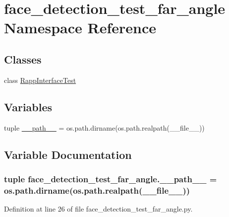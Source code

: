\hypertarget{namespaceface__detection__test__far__angle}{\section{face\-\_\-detection\-\_\-test\-\_\-far\-\_\-angle Namespace Reference}
\label{namespaceface__detection__test__far__angle}
}
\subsection*{Classes}
\begin{DoxyCompactItemize}
\item 
class \hyperlink{classface__detection__test__far__angle_1_1RappInterfaceTest}{Rapp\-Interface\-Test}
\end{DoxyCompactItemize}
\subsection*{Variables}
\begin{DoxyCompactItemize}
\item 
tuple \hyperlink{namespaceface__detection__test__far__angle_adbc7e4d09199bdba4ca4c8aa21482ba1}{\-\_\-\-\_\-path\-\_\-\-\_\-} = os.\-path.\-dirname(os.\-path.\-realpath(\-\_\-\-\_\-file\-\_\-\-\_\-))
\end{DoxyCompactItemize}


\subsection{Variable Documentation}
\hypertarget{namespaceface__detection__test__far__angle_adbc7e4d09199bdba4ca4c8aa21482ba1}{
\subsubsection[{\-\_\-\-\_\-path\-\_\-\-\_\-}]{\setlength{\rightskip}{0pt plus 5cm}tuple face\-\_\-detection\-\_\-test\-\_\-far\-\_\-angle.\-\_\-\-\_\-path\-\_\-\-\_\- = os.\-path.\-dirname(os.\-path.\-realpath(\-\_\-\-\_\-file\-\_\-\-\_\-))}}\label{namespaceface__detection__test__far__angle_adbc7e4d09199bdba4ca4c8aa21482ba1}


Definition at line 26 of file face\-\_\-detection\-\_\-test\-\_\-far\-\_\-angle.\-py.

